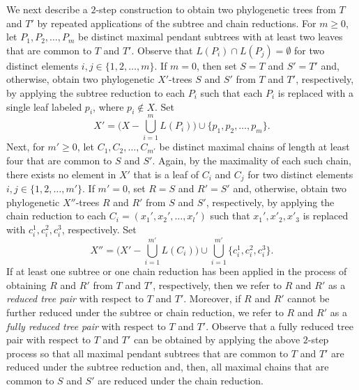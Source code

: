 \documentclass{article}
\begin{document}
\noindent We next describe a $2$-step construction to obtain two phylogenetic trees from $T$ and $T'$ by repeated applications of the subtree and chain reductions. For $m\geq 0$, let $P_1,P_2,\ldots,P_m$ be distinct maximal pendant subtrees with at least two leaves that are common to $T$ and $T'$. Observe that $L(P_i)\cap L(P_j)=\emptyset$ for two distinct elements $i,j\in\{1,2,\ldots,m\}$. If $m=0$, then set $S=T$ and $S'=T'$ and, otherwise, obtain two phylogenetic $X'$-trees $S$ and $S'$  from $T$ and $T'$, respectively, by applying the subtree reduction to each $P_i$ such that each $P_i$ is replaced with a single leaf labeled $p_i$, where $p_i\notin X$. Set
$$X'=\big(X-\bigcup_{i=1}^m L(P_i)\big)\cup\{p_1,p_2,\ldots,p_m\}.$$  
Next, for $m'\geq 0$, let $C_1,C_2,\ldots,C_{m'}$ be distinct maximal chains of length at least four that are common to $S$ and $S'$. Again, by the maximality of each such chain, there exists no element in $X'$ that is a leaf of $C_i$ and $C_j$ for two distinct elements $i,j\in\{1,2,\ldots,m'\}$. If $m'=0$, set $R=S$ and $R'=S'$ and, otherwise, obtain two phylogenetic $X''$-trees $R$ and $R'$  from $S$ and $S'$, respectively, by applying the chain reduction to each $C_i=(x_1',x_2',\ldots,x_l')$ such that $x_1', x'_2, x'_3$ is replaced with $c_i^1, c^2_i, c^3_i$, respectively. Set
$$X''=\big(X'-\bigcup_{i=1}^{m'} L(C_i)\big) \cup \bigcup_{i=1}^{m'}\{c_i^1,c_i^2,c_i^3\}.$$ 
If at least one subtree or one chain reduction has been applied in the process of obtaining $R$ and $R'$ from $T$ and $T'$, respectively, then we refer to $R$ and $R'$ as a {\em reduced tree pair} with respect to $T$ and $T'$.
Moreover, if $R$ and $R'$ cannot be further reduced under the subtree or chain reduction, we refer to $R$ and $R'$ as a {\em fully reduced tree pair} with respect to $T$ and $T'$. Observe that a fully reduced tree pair with respect to $T$ and $T'$ can be obtained by applying the above $2$-step process so that all maximal pendant subtrees that are common to $T$ and $T'$ are reduced under the subtree reduction and, then, all maximal chains that are common to $S$ and $S'$ are reduced under the chain reduction.
\end{document}
